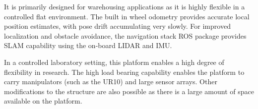 \documentclass[times, utf8, diplomski, english]{fer}
\begin{document}
\begin{figure}[h]
\begin{floatrow}
\end{floatrow}
\end{figure}
It is primarily designed for warehousing applications as it is highly flexible in a controlled flat environment.
The built in wheel odometry provides accurate local position estimates, with pose drift accumulating very slowly.
For improved localization and obstacle avoidance, the navigation stack ROS package provides SLAM capability using the on-board LIDAR and IMU.

In a controlled laboratory setting, this platform enables a high degree of flexibility in research.
The high load bearing capability enables the platform to carry manipulators (such as the UR10) and large sensor arrays.
Other modifications to the structure are also possible as there is a large amount of space available on the platform. 

\newpage
\end{document}
